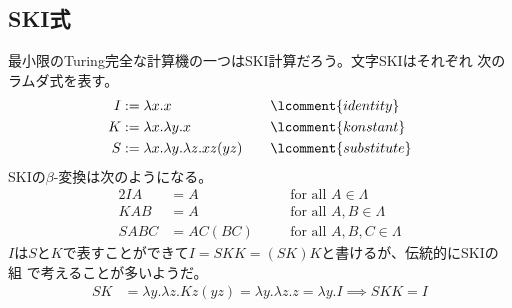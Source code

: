 {\subsection{SKI式}\label{s2:SKI式} %
	最小限のTuring完全な計算機の一つはSKI計算だろう。文字SKIはそれぞれ
	次のラムダ式を表す。
	\begin{alignat*}{2}
		I &:= \lambda x. x &\quad&\lcomment{identity} \\
		K &:= \lambda x.\lambda y. x &\quad&\lcomment{konstant} \\
		S &:= \lambda x.\lambda y.\lambda z. xz(yz) 
		&\quad&\lcomment{substitute}
	\end{alignat*}
	SKIの$\beta$-変換は次のようになる。
	\begin{alignat*}{2}
		IA &= A &\quad&\text{for all } A\in\Lambda \\
		KAB &= A &\quad&\text{for all } A,B\in\Lambda \\
		SABC &= AC(BC) &\quad&\text{for all } A,B,C\in\Lambda
	\end{alignat*}
	$I$は$S$と$K$で表すことができて$I=SKK=(SK)K$と書けるが、伝統的にSKIの組
	で考えることが多いようだ。
	\begin{equation*}\begin{split}
		SK &= \lambda y.\lambda z. Kz(yz)
		= \lambda y.\lambda z. z = \lambda y.I \implies SKK = I
	\end{split}\end{equation*}

}
